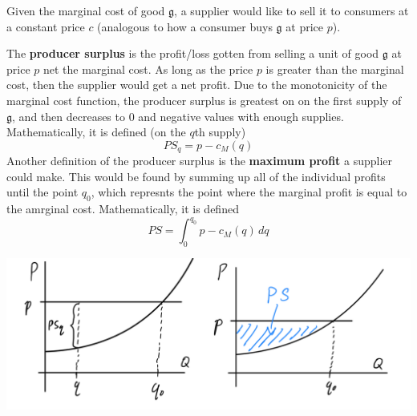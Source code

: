\documentclass{article}
\begin{document}
    \begin{definition}
      Given the marginal cost of good $\mathfrak{g}$, a supplier would like to sell it to consumers at a constant price $c$ (analogous to how a consumer buys $\mathfrak{g}$ at price $p$). 

      The \textbf{producer surplus} is the profit/loss gotten from selling a unit of good $\mathfrak{g}$ at price $p$ net the marginal cost. As long as the price $p$ is greater than the marginal cost, then the supplier would get a net profit. Due to the monotonicity of the marginal cost function, the producer surplus is greatest on on the first supply of $\mathfrak{g}$, and then decreases to $0$ and negative values with enough supplies. Mathematically, it is defined (on the $q$th supply) 
      \[PS_q = p - c_M (q)\]
      Another definition of the producer surplus is the \textbf{maximum profit} a supplier could make. This would be found by summing up all of the individual profits until the point $q_0$, which represnts the point where the marginal profit is equal to the amrginal cost. Mathematically, it is defined
      \[PS = \int_0^{q_0} p - c_M (q) \, dq\]
      \begin{center}
        \includegraphics[scale=0.25]{img/Producer_Surplus.PNG}
      \end{center}
    \end{definition}
\end{document}
